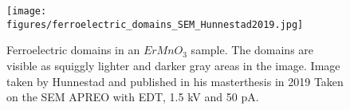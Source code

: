 

\begin{figure}
\centering
\texttt{[image: figures/ferroelectric\_domains\_SEM\_Hunnestad2019.jpg]}
\caption{
    Ferroelectric domains in an $ErMnO_3$ sample. 
    The domains are visible as squiggly lighter and darker gray areas in the image.
    Image taken by Hunnestad and published in his masterthesis in 2019 %
    Taken on the SEM APREO with EDT, 1.5 kV and 50 pA.
}
\label{fig:ferroelectric_domains_SEM_Hunnestad2019}
\end{figure}
